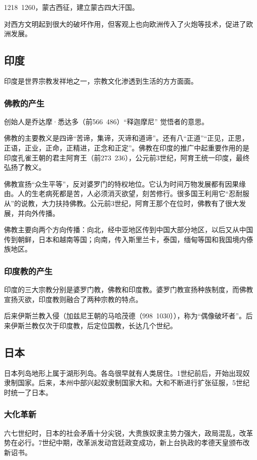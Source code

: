 1218~1260，蒙古西征，建立蒙古四大汗国。

对西方文明起到很大的破坏作用，但客观上也向欧洲传入了火炮等技术，促进了欧洲发展。

\subsection{印度}
印度是世界宗教发祥地之一，宗教文化渗透到生活的方方面面。

\subsubsection{佛教的产生}

创始人是乔达摩·悉达多（前566~486）“释迦摩尼” 觉悟者的意思。

佛教的主要教义是四谛“苦谛，集谛，灭谛和道谛”。还有八“正道”“正见，正思，正语，正业，正命，正精进，正念和正定”。佛教在印度的推广中起重要作用的是印度孔雀王朝的君主阿育王（前273~236），公元前3世纪，阿育王统一印度，最终弘扬了教义。

佛教宣扬“众生平等”，反对婆罗门的特权地位。它认为时间万物发展都有因果缘由。人的生老病死都是苦，人必须消灭欲望，刻苦修行。很多国王利用它“忍耐服从”的说教，大力扶持佛教。公元前3世纪，阿育王那个在位时，佛教有了很大发展，并向外传播。

佛教主要向两个方向传播：向北，经中亚地区传到中国大部分地区，以后又从中国传到朝鲜，日本和越南等国；向南，传入斯里兰卡，泰国，缅甸等国和我国境内傣族地区。

\subsubsection{印度教的产生}
印度的三大宗教分别是婆罗门教，佛教和印度教。婆罗门教宣扬种族制度，而佛教宣扬灭欲，印度教则融合了两种宗教的特点。

后来伊斯兰教入侵（加兹尼王朝的马哈茂德（998~1030）），称为“偶像破坏者”。后来伊斯兰教仅次于印度教，后定位国教，长达几个世纪。

\subsection{日本}
日本列岛地形上属于湖形列岛。各岛很早就有人类居住。1世纪前后，开始出现奴隶制国家。后来，本州中部兴起奴隶制国家大和。大和不断进行扩张征服，5世纪时统一了日本。

\subsubsection{大化革新}
六七世纪时，日本的社会矛盾十分尖锐，大贵族奴隶主势力强大，政局混乱，改革势在必行。7世纪中期，改革派发动宫廷政变成功，新上台执政的孝德天皇颁布改新诏书。

